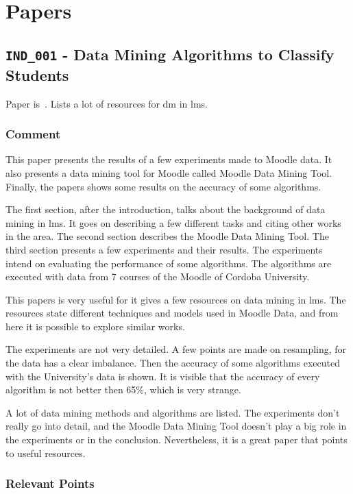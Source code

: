\chapter{Papers}

\section{\texttt{IND\_001} - Data Mining Algorithms to Classify Students}

Paper is~\cite{ind_001}. Lists a lot of resources for \gls{dm} in \gls{lms}.

\subsection{Comment}

This paper presents the results of a few experiments made to Moodle data. It
also presents a data mining tool for Moodle called Moodle Data Mining Tool.
Finally, the papers shows some results on the accuracy of some algorithms.

The first section, after the introduction, talks about the background of data
mining in \gls{lms}. It goes on describing a few different tasks and citing
other works in the area. The second section describes the Moodle Data Mining
Tool. The third section presents a few experiments and their results. The
experiments intend on evaluating the performance of some algorithms. The
algorithms are executed with data from 7 courses of the Moodle of Cordoba
University.

This papers is very useful for it gives a few resources on data mining in
\gls{lms}. The resources state different techniques and models used in Moodle
Data, and from here it is possible to explore similar works.

The experiments are not very detailed. A few points are made on resampling, for
the data has a clear imbalance. Then the accuracy of some algorithms executed
with the University's data is shown. It is visible that the accuracy of every
algorithm is not better then 65\%, which is very strange.

A lot of data mining methods and algorithms are listed. The experiments don't
really go into detail, and the Moodle Data Mining Tool doesn't play a big role
in the experiments or in the conclusion. Nevertheless, it is a great paper that
points to useful resources.

\subsection{Relevant Points}

